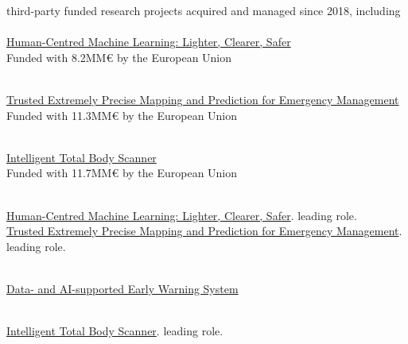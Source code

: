 
\ifdefined{} third-party funded research projects acquired and managed since 2018, including\\
     
        {\\\href{https://www.hhi.fraunhofer.de/en/departments/ai/projects/achilles.html}{
        Human-Centred Machine Learning: Lighter, Clearer, Safer}\\ Funded with 8.2MM€ by the European Union}
        
     {\\\href{https://www.hhi.fraunhofer.de/en/departments/ai/projects/tema.html}{
                        Trusted Extremely Precise Mapping
                    and Prediction for Emergency Management} \\ Funded with 11.3MM€ by the European Union}
                    
    {
        \\\href{https://www.hhi.fraunhofer.de/en/departments/ai/projects/itobos.html}{ Intelligent Total Body Scanner} \\ Funded with 11.7MM€ by the European Union
    }
     
\else
    {
        \\
        \href{https://www.hhi.fraunhofer.de/en/departments/ai/projects/achilles.html}{
        Human-Centred Machine Learning: Lighter, Clearer, Safer}. leading role.
    }
    {
        \\
        \href{https://www.hhi.fraunhofer.de/en/departments/ai/projects/tema.html}{
                        Trusted Extremely Precise Mapping
                    and Prediction for Emergency Management}. leading role.
    }

    {
        \\
        \href{https://www.hhi.fraunhofer.de/en/departments/ai/projects/daki-fws.html}{Data- and AI-supported Early Warning System}
    }

    {
        \\
        \href{https://www.hhi.fraunhofer.de/en/departments/ai/projects/itobos.html}{ Intelligent Total Body Scanner}. leading role.
    }

